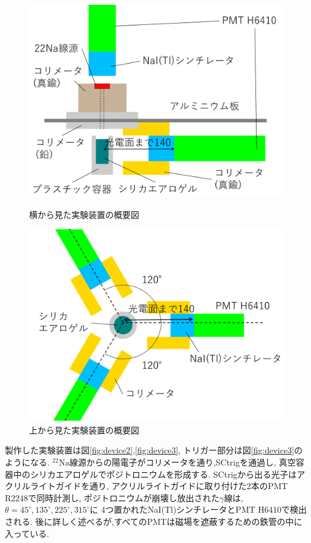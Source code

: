 \begin{figure}[H]
\begin{minipage}{0.5\hsize}
\centering
\includegraphics[keepaspectratio,scale=0.3]{fig/ybm/device5.pdf}
\caption{横から見た実験装置の概要図}
\label{fig:device5}
\end{minipage}
\begin{minipage}{0.5\hsize}
\centering
\includegraphics[keepaspectratio,scale=0.3]{fig/ybm/device6.pdf}
\caption{上から見た実験装置の概要図}
\label{fig:device6}
\end{minipage}
\end{figure}

製作した実験装置は図\ref{fig:device2},\ref{fig:device3},
トリガー部分は図\ref{fig:device3}のようになる.
$\mathrm{^{22}Na}$線源からの陽電子がコリメータを通り,SCtrigを通過し,
真空容器中のシリカエアロゲルでポジトロニウムを形成する.
SCtrigから出る光子はアクリルライトガイドを通り,
アクリルライトガイドに取り付けた2本のPMT R2248で同時計測し,
ポジトロニウムが崩壊し放出された$\gamma$線は,
$\theta=45^{\circ},135^{\circ},225^{\circ},315^{\circ}$に
4つ置かれたNaI(Tl)シンチレータとPMT H6410で検出される.
後に詳しく述べるが,すべてのPMTは磁場を遮蔽するための鉄管の中に入っている.

